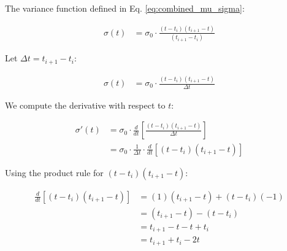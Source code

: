 \documentclass[twoside]{article}
\begin{document}



The variance function defined in Eq. \eqref{eq:combined_mu_sigma}:

\begin{align}
\sigma(t) &= \sigma_0 \cdot \frac{(t-t_{i})(t_{i+1}-t)}{(t_{i+1}-t_i)}
\end{align}

Let $\Delta t = t_{i+1} - t_i$:

\begin{align}
\sigma(t) &= \sigma_0 \cdot \frac{(t-t_{i})(t_{i+1}-t)}{\Delta t}
\end{align}

We compute the derivative with respect to $t$:

\begin{align}
\sigma'(t) &= \sigma_0 \cdot \frac{d}{dt}\left[\frac{(t-t_{i})(t_{i+1}-t)}{\Delta t}\right] \\
&= \sigma_0 \cdot \frac{1}{\Delta t} \cdot \frac{d}{dt}\left[(t-t_{i})(t_{i+1}-t)\right]
\end{align}

Using the product rule for $(t-t_{i})(t_{i+1}-t)$:

\begin{align}\label{eq:spline_path}
\frac{d}{dt}\left[(t-t_{i})(t_{i+1}-t)\right] &= (1)(t_{i+1}-t) + (t-t_{i})(-1) \\
&= (t_{i+1}-t) - (t-t_{i}) \\
&= t_{i+1} - t - t + t_{i} \\
&= t_{i+1} + t_{i} - 2t
\end{align}
\end{document}
